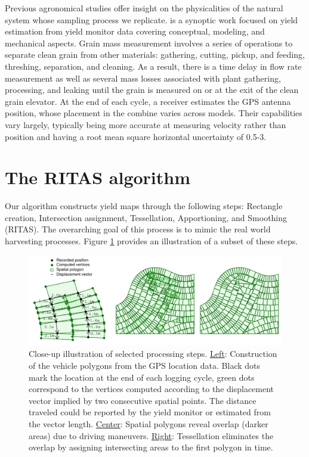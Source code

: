 \documentclass[12pt]{article}
\begin{document}
Previous agronomical studies offer insight on the physicalities of the
natural system whose sampling process we replicate. \cite{Ross2008} is
a synoptic work focused on yield estimation from yield monitor data
covering conceptual, modeling, and mechanical aspects. Grain mass
measurement involves a series of operations to separate clean grain
from other materials: gathering, cutting, pickup, and feeding,
threshing, separation, and cleaning. As a result, there is a time
delay in flow rate measurement as well as several mass losses
associated with plant gathering, processing, and leaking until the
grain is measured on or at the exit of the clean grain elevator. At
the end of each cycle, a receiver estimates the GPS antenna position,
whose placement in the combine varies across models. Their
capabilities vary largely, typically being more accurate at measuring
velocity rather than position and having a root mean square horizontal
uncertainty of 0.5-3.

\section{The RITAS algorithm}%
\label{sec:ritas}

Our algorithm constructs yield maps through the following steps:
Rectangle creation, Intersection assignment, Tessellation,
Apportioning, and Smoothing (RITAS). The overarching goal of this
process is to mimic the real world harvesting processes. Figure
\ref{fig:closeup} provides an illustration of a subset of these steps.

\begin{figure}[h!]  \centering
  \includegraphics[width=\textwidth]{algoplots}
  \caption[Close-up illustration of selected algorithm steps]{Close-up
    illustration of selected processing steps. \underline{Left}:
    Construction of the vehicle polygons from the GPS location
    data. Black dots mark the location at the end of each logging
    cycle, green dots correspond to the vertices computed according to
    the displacement vector implied by two consecutive spatial
    points. The distance traveled could be reported by the yield
    monitor or estimated from the vector length. \underline{Center}:
    Spatial polygons reveal overlap (darker areas) due to driving
    maneuvers. \underline{Right}: Tessellation eliminates the overlap
    by assigning intersecting areas to the first polygon in time.}
    \label{fig:closeup}
\end{figure}
\end{document}

